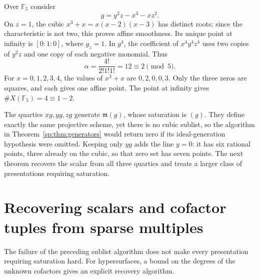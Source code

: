 \begin{example}
\label{sp:ex:cubic}
Over $\mathbb F_5$ consider
\[
 g=y^2z-x^3-xz^2.
\]
On $z=1$, the cubic $x^3+x=x(x-2)(x-3)$ has distinct roots; since the
characteristic is not two, this proves affine smoothness. Its unique
point at infinity is $[0:1:0]$, where $g_z=1$.
In $g^4$, the coefficient of $x^4y^4z^4$ uses two copies of $y^2z$ and
one copy of each negative monomial. Thus
\[
 \alpha=\frac{4!}{2!1!1!}=12\equiv2\pmod5.
\]
For $x=0,1,2,3,4$, the values of $x^3+x$ are $0,2,0,0,3$.
Only the three zeros are squares, and each gives one affine point.
The point at infinity gives $\#X(\mathbb F_5)=4\equiv1-2$.

The quartics $xg,yg,zg$ generate $\mathfrak m(g)$, whose saturation is
$(g)$. They define exactly the same projective scheme, yet there is no
cubic sublist, so the algorithm in Theorem~\ref{sp:thm:generators} would
return zero if its ideal-generation hypothesis were omitted. Keeping
only $yg$ adds the line $y=0$: it has six rational points, three already
on the cubic, so that zero set has seven points. The next theorem
recovers the scalar from all three quartics and treats a larger class
of presentations requiring saturation.
\end{example}

\section{Recovering scalars and cofactor tuples from sparse multiples}
\label{sp:sec:saturation}
The failure of the preceding sublist algorithm does not make every
presentation requiring saturation hard. For hypersurfaces, a bound on
the degrees of the unknown cofactors gives an explicit recovery algorithm.


